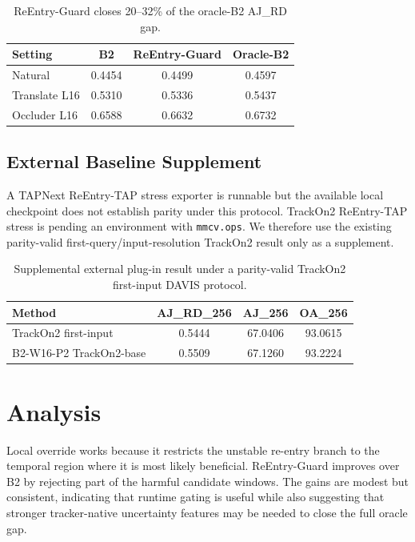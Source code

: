 \documentclass[10pt,twocolumn]{article}
\begin{document}
\begin{table}[h]
\centering
\small
\begin{tabular}{lccc}
\toprule
Setting & B2 & ReEntry-Guard & Oracle-B2 \\
\midrule
Natural & 0.4454 & 0.4499 & 0.4597 \\
Translate L16 & 0.5310 & 0.5336 & 0.5437 \\
Occluder L16 & 0.6588 & 0.6632 & 0.6732 \\
\bottomrule
\end{tabular}
\caption{ReEntry-Guard closes 20--32\% of the oracle-B2 AJ\_RD gap.}
\end{table}

\subsection{External Baseline Supplement}

A TAPNext ReEntry-TAP stress exporter is runnable but the available local checkpoint does not establish parity under this protocol. TrackOn2 ReEntry-TAP stress is pending an environment with \texttt{mmcv.ops}. We therefore use the existing parity-valid first-query/input-resolution TrackOn2 result only as a supplement.

\begin{table}[h]
\centering
\small
\begin{tabular}{lccc}
\toprule
Method & AJ\_RD\_256 & AJ\_256 & OA\_256 \\
\midrule
TrackOn2 first-input & 0.5444 & 67.0406 & 93.0615 \\
B2-W16-P2 TrackOn2-base & 0.5509 & 67.1260 & 93.2224 \\
\bottomrule
\end{tabular}
\caption{Supplemental external plug-in result under a parity-valid TrackOn2 first-input DAVIS protocol.}
\end{table}

\section{Analysis}

Local override works because it restricts the unstable re-entry branch to the temporal region where it is most likely beneficial. ReEntry-Guard improves over B2 by rejecting part of the harmful candidate windows. The gains are modest but consistent, indicating that runtime gating is useful while also suggesting that stronger tracker-native uncertainty features may be needed to close the full oracle gap.
\end{document}
